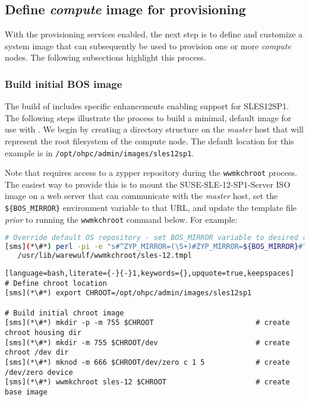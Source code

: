 \documentclass[letterpaper]{article}
\newcommand{\baseOS}{SLES12SP1}
\newcommand{\baseos}{sles12sp1}
\begin{document}
\subsection{Define {\em compute} image for provisioning}

With the provisioning services enabled, the next step is to define and
customize a system image that can subsequently be used to provision one or more
{\em compute} nodes. The following subsections highlight this process.

\subsubsection{Build initial BOS image} \label{sec:assemble_bos}

The \OHPC{} build of \Warewulf{} includes specific enhancements enabling support for
\baseOS{}. The following steps illustrate the process to build a minimal, default
image for use with \Warewulf{}. We begin by creating a directory structure on the 
{\em master} host that will represent the root filesystem of the compute node. The 
default location for this example is in
\texttt{/opt/ohpc/admin/images/\baseos{}}.

\begin{center}
  \begin{tcolorbox}[]
    \small Note that \Warewulf{} requires access to a zypper repository during the 
    \texttt{wwmkchroot} process. The easiest way to provide this is to mount 
    the SUSE-SLE-12-SP1-Server ISO image on a web server that can communicate 
    with the {\em master} host, set the \texttt{\$\{BOS\_MIRROR\}} environment 
    variable to that URL, and update the template file {\em prior} to running 
    the \texttt{wwmkchroot} command below. For example:

\begin{lstlisting}[language=bash,keywords={}]
# Override default OS repository - set BOS_MIRROR variable to desired repo location
[sms](*\#*) perl -pi -e "s#^ZYP_MIRROR=(\S+)#ZYP_MIRROR=${BOS_MIRROR}#" \
   /usr/lib/warewulf/wwmkchroot/sles-12.tmpl
\end{lstlisting}

\end{tcolorbox}
\end{center}

\begin{lstlisting}[language=bash,literate={-}{-}1,keywords={},upquote=true,keepspaces]
# Define chroot location
[sms](*\#*) export CHROOT=/opt/ohpc/admin/images/sles12sp1

# Build initial chroot image
[sms](*\#*) mkdir -p -m 755 $CHROOT                        # create chroot housing dir
[sms](*\#*) mkdir -m 755 $CHROOT/dev                       # create chroot /dev dir
[sms](*\#*) mknod -m 666 $CHROOT/dev/zero c 1 5            # create /dev/zero device
[sms](*\#*) wwmkchroot sles-12 $CHROOT                     # create base image
\end{lstlisting}
\end{document}
